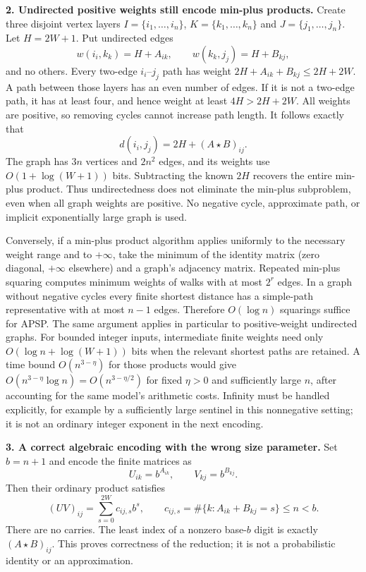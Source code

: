 \documentclass[11pt,a4paper]{article}
\numberwithin{equation}{section}
\begin{document}
\textbf{2. Undirected positive weights still encode min-plus products.}
Create three disjoint vertex layers $I=\{i_1,\ldots,i_n\}$,
$K=\{k_1,\ldots,k_n\}$ and $J=\{j_1,\ldots,j_n\}$. Let
$H=2W+1$. Put undirected edges
\[
 w(i_i,k_k)=H+A_{ik},\qquad w(k_k,j_j)=H+B_{kj},
\]
and no others. Every two-edge $i_i$--$j_j$ path has weight
$2H+A_{ik}+B_{kj}\leq2H+2W$. A path between those layers has an even
number of edges. If it is not a two-edge path, it has at least four,
and hence weight at least $4H>2H+2W$. All weights are positive, so
removing cycles cannot increase path length. It follows exactly that
\begin{equation}\label{statement:gadget}
 d(i_i,j_j)=2H+(A\star B)_{ij}.
\end{equation}
The graph has $3n$ vertices and $2n^2$ edges, and its weights use
$O(1+\log(W+1))$ bits. Subtracting the known $2H$ recovers the entire
min-plus product. Thus undirectedness does not eliminate the min-plus
subproblem, even when all graph weights are positive. No negative cycle,
approximate path, or implicit exponentially large graph is used.

Conversely, if a min-plus product algorithm applies uniformly to the
necessary weight range and to $+\infty$, take the minimum of the identity
matrix (zero diagonal, $+\infty$ elsewhere) and a graph's adjacency
matrix. Repeated min-plus squaring computes minimum weights of walks
with at most $2^r$ edges. In a graph without negative cycles every finite
shortest distance has a simple-path representative with at most $n-1$
edges. Therefore $O(\log n)$ squarings suffice for APSP. The same argument
applies in particular to positive-weight undirected graphs. For bounded
integer inputs, intermediate finite weights need only $O(\log n+\log
(W+1))$ bits when the relevant shortest paths are retained.
A time bound $O(n^{3-\eta})$ for those products would give
$O(n^{3-\eta}\log n)=O(n^{3-\eta/2})$ for fixed $\eta>0$ and
sufficiently large $n$, after accounting for the same model's arithmetic
costs. Infinity must be handled explicitly, for example by a sufficiently
large sentinel in this nonnegative setting; it is not an ordinary
integer exponent in the next encoding.

\textbf{3. A correct algebraic encoding with the wrong size parameter.}
Set $b=n+1$ and encode the finite matrices as
\[
 U_{ik}=b^{A_{ik}},\qquad V_{kj}=b^{B_{kj}}.
\]
Then their ordinary product satisfies
\begin{equation}\label{statement:base}
 (UV)_{ij}=\sum_{s=0}^{2W}c_{ij,s}b^s,
 \qquad c_{ij,s}=\#\{k:A_{ik}+B_{kj}=s\}\leq n<b.
\end{equation}
There are no carries. The least index of a nonzero base-$b$ digit is
exactly $(A\star B)_{ij}$. This proves correctness of the reduction; it
is not a probabilistic identity or an approximation.
\end{document}
